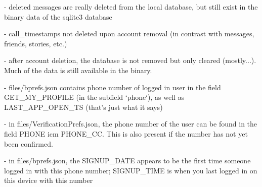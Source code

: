 \documentclass[conference]{IEEEtran}
\begin{document}
- deleted messages are really deleted from the local database, but still exist in the binary data of the sqlite3 database

- call_timestamps not deleted upon account removal (in contrast with messages, friends, stories, etc.)

- after account deletion, the database is not removed but only cleared (mostly...). Much of the data is still available in the binary.

- files/bprefs.json contains phone number of logged in user in the field GET_MY_PROFILE (in the subfield `phone`), as well as LAST_APP_OPEN_TS (that's just what it says)

- in files/VerificationPrefs.json, the phone number of the user can be found in the field PHONE icm PHONE_CC. This is also present if the number has not yet been confirmed.

- in files/bprefs.json, the SIGNUP_DATE appears to be the first time someone logged in with this phone number; SIGNUP_TIME is when you last logged in on this device with this number


%
%
%





\printbibliography
\end{document}
